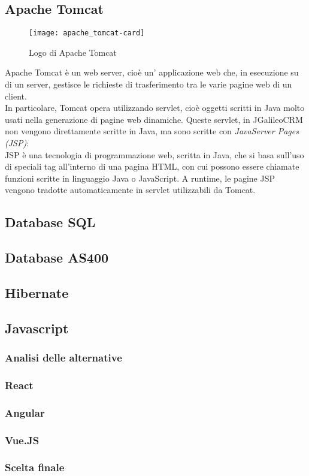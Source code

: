 \subsection{Apache Tomcat}
\begin{figure}[h]
	\centering
	\texttt{[image: apache\_tomcat-card]}
	\caption{Logo di Apache Tomcat}
\end{figure}
Apache Tomcat è un web server, cioè un' applicazione web che, in esecuzione su di un server, gestisce le richieste di trasferimento tra le varie pagine web di un client.\\
In particolare, Tomcat opera utilizzando servlet, cioè oggetti scritti in Java molto usati nella generazione di pagine web dinamiche.
Queste servlet, in JGalileoCRM non vengono direttamente scritte in Java, ma sono scritte con \emph{JavaServer Pages (JSP)}:\\
JSP è una tecnologia di programmazione web, scritta in Java, che si basa sull'uso di speciali tag all'interno di una pagina HTML, con cui possono essere chiamate funzioni scritte in linguaggio Java o JavaScript.
A runtime, le pagine JSP vengono tradotte automaticamente in servlet utilizzabili da Tomcat. 
\subsection{Database SQL}
\subsection{Database AS400}
\subsection{Hibernate}
\subsection{Javascript}
\subsubsection{Analisi delle alternative}
\subsubsection{React}
\subsubsection{Angular}
\subsubsection{Vue.JS}
\subsubsection{Scelta finale}